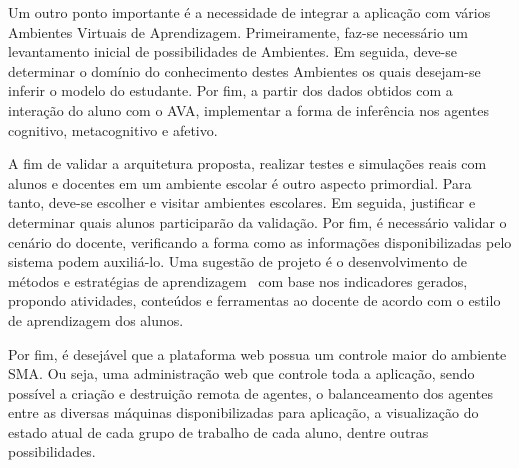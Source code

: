 Um outro ponto importante é a necessidade de integrar a aplicação com vários Ambientes Virtuais de Aprendizagem. Primeiramente, faz-se necessário um levantamento inicial de possibilidades de Ambientes. Em seguida, deve-se determinar o domínio do conhecimento destes Ambientes os quais desejam-se inferir o modelo do estudante. Por fim, a partir dos dados obtidos com a interação do aluno com o AVA, implementar a forma de inferência nos agentes cognitivo, metacognitivo e afetivo.

A fim de validar a arquitetura proposta, realizar testes e simulações reais com alunos e docentes em um ambiente escolar é outro aspecto primordial. Para tanto, deve-se escolher e visitar ambientes escolares. Em seguida, justificar e determinar quais alunos participarão da validação. Por fim, é necessário validar o cenário do docente, verificando a forma como as informações disponibilizadas pelo sistema podem auxiliá-lo. Uma sugestão de projeto é o desenvolvimento de métodos e estratégias de aprendizagem~\cite{muhlbeier12} com base nos indicadores gerados, propondo atividades, conteúdos e ferramentas ao docente de acordo com o estilo de aprendizagem dos alunos.

Por fim, é desejável que a plataforma web possua um controle maior do ambiente SMA. Ou seja, uma administração web que controle toda a aplicação, sendo possível a criação e destruição remota de agentes, o balanceamento dos agentes entre as diversas máquinas disponibilizadas para aplicação, a visualização do estado atual de cada grupo de trabalho de cada aluno, dentre outras possibilidades.
